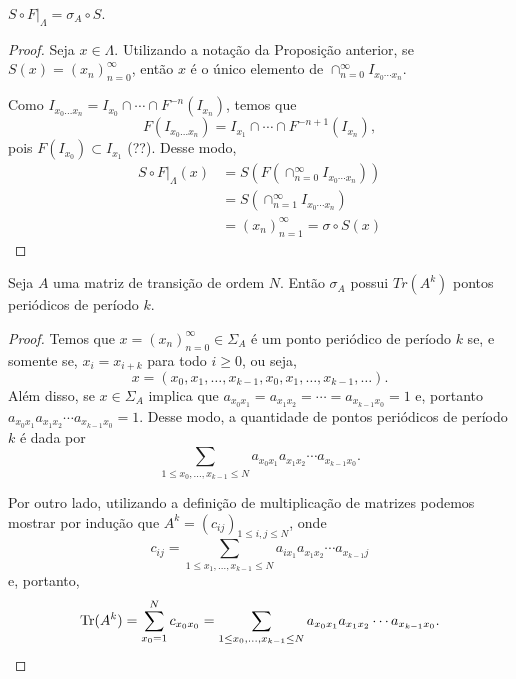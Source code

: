 \begin{theorem}
$S \circ F|_\Lambda = \sigma_A \circ S$.
\end{theorem}


\begin{proof}
Seja $x \in \Lambda$. Utilizando a notação da Proposição anterior, se $S(x) = (x_n)_{n=0}^\infty$, então $x$ é o único elemento de $\cap_{n=0}^\infty I_{x_0 \cdots x_n}$.

Como $I_{x_0 \dots x_n} = I_{x_0} \cap \cdots \cap F^{-n}(I_{x_n})$, temos que
$$F(I_{x_0 \dots x_n}) = I_{x_1} \cap \cdots \cap F^{-n+1}(I_{x_n}),$$
pois $F(I_{x_0}) \subset I_{x_1}$ (??). Desse modo,
\begin{align*}
S \circ F|_{\Lambda}(x) & = S(F(\cap_{n=0}^\infty I_{x_0 \cdots x_n})) \\
& = S(\cap_{n=1}^\infty I_{x_0 \cdots x_n}) \\
& = (x_n)_{n=1}^\infty  = \sigma \circ S(x)
\end{align*}
\end{proof}


\begin{proposition}
Seja $A$ uma matriz de transição de ordem $N$. Então $\sigma_A$ possui $Tr(A^k)$ pontos periódicos de período $k$.
\end{proposition}


\begin{proof}
Temos que $x = (x_n)_{n=0}^\infty \in \Sigma_A$ é um ponto periódico de período $k$ se, e somente se, $x_i = x_{i+k}$ para todo $i \geq 0$, ou seja,
$$x = (x_0, x_1, \dots, x_{k-1}, x_0, x_1, \dots, x_{k-1}, \dots).$$
Além disso, se $x \in \Sigma_A$ implica que $a_{x_0 x_1} = a_{x_1 x_2} = \cdots = a_{x_{k-1} x_0} = 1$ e, portanto  $a_{x_0 x_1} a_{x_1 x_2}  \cdots a_{x_{k-1} x_0} = 1$. Desse modo, a quantidade de pontos periódicos de período $k$ é dada por
$$\sum_{1 \leq x_0, \dots, x_{k-1} \leq N} a_{x_0 x_1} a_{x_1 x_2}  \cdots a_{x_{k-1} x_0}.$$

Por outro lado, utilizando a definição de multiplicação de matrizes podemos mostrar por indução que $A^k = (c_{ij})_{1 \leq i, j \leq N}$, onde
$$c_{ij} = \sum_{1 \leq x_1, \dots, x_{k-1} \leq N} a_{i x_1} a_{x_1 x_2}  \cdots a_{x_{k-1}j}$$
e, portanto,
$$\operatorname{Tr}(A^k) = \sum_{x_0 = 1}^N c_{x_0 x_0} = \sum_{1 \leq x_0, \dots, x_{k-1} \leq N} a_{x_0 x_1} a_{x_1 x_2}  \cdots a_{x_{k-1} x_0}.$$
\end{proof}











